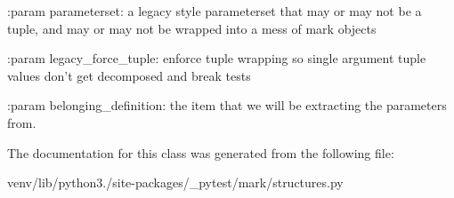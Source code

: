 \begin{DoxyVerb}:param parameterset:
    a legacy style parameterset that may or may not be a tuple,
    and may or may not be wrapped into a mess of mark objects

:param legacy_force_tuple:
    enforce tuple wrapping so single argument tuple values
    don't get decomposed and break tests

:param belonging_definition: the item that we will be extracting the parameters from.
\end{DoxyVerb}
 

The documentation for this class was generated from the following file\+:\begin{DoxyCompactItemize}
\item 
venv/lib/python3./site-\/packages/\+\_\+pytest/mark/structures.\+py\end{DoxyCompactItemize}
